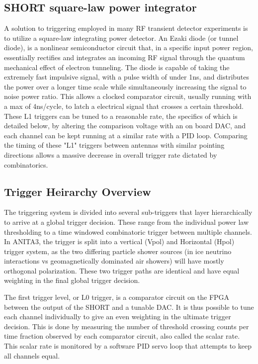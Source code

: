 	\subsection{SHORT square-law power integrator}
		A solution to triggering employed in many RF transient detector experiments is to utilize a square-law integrating power detector.  An Ezaki diode (or tunnel diode), is a nonlinear semiconductor circuit that, in a specific input power region, essentially rectifies and integrates an incoming RF signal through the quantum mechanical effect of electron tunneling.  The diode is capable of taking the extremely fast impulsive signal, with a pulse width of under 1ns, and distributes the power over a longer time scale while simultaneously increasing the signal to noise power ratio.  This allows a clocked comparator circuit, usually running with a max of 4ns/cycle, to latch a electrical signal that crosses a certain threshold.  These L1 triggers can be tuned to a reasonable rate, the specifics of which is detailed below, by altering the comparison voltage with an on board DAC, and each channel can be kept running at a similar rate with a PID loop.  Comparing the timing of these "L1" triggers between antennas with similar pointing directions allows a massive decrease in overall trigger rate dictated by combinatorics.
		
	
	\subsection{Trigger Heirarchy Overview}
		The triggering system is divided into several sub-triggers that layer hierarchically to arrive at a global trigger decision.   These range from the individual power law thresholding to a time windowed combinatoric trigger between multiple channels.  In ANITA3, the trigger is split into a vertical (Vpol) and Horizontal (Hpol) trigger system, as the two differing particle shower sources (in ice neutrino interactions vs geomagnetically dominated air showers) will have mostly orthogonal polarization.  These two trigger paths are identical and have equal weighting in the final global trigger decision.  
		
		The first trigger level, or L0 trigger, is a comparator circuit on the FPGA between the output of the SHORT and a tunable DAC. It is thus possible to tune each channel individually to give an even weighting in the ultimate trigger decision.  This is done by measuring the number of threshold crossing counts per time fraction observed by each comparator circuit, also called the scalar rate.  This scalar rate is monitored by a software PID servo loop that attempts to keep all channels equal.
		
